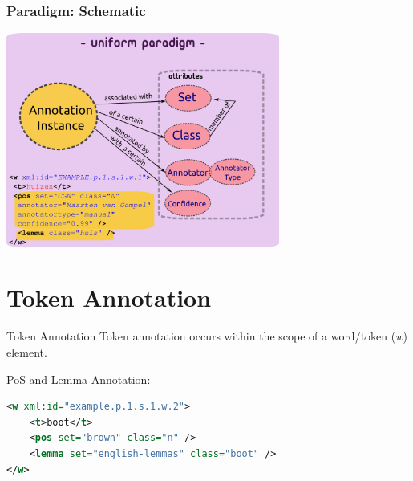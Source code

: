 \documentclass[compress]{beamer}
\begin{document}
\begin{frame}
        \frametitle{Paradigm: Schematic}
        \begin{center}
        \includegraphics[width=90.0mm]{paradigm.png}
        \end{center}
\end{frame}


\section{Token Annotation}

\begin{frame}[fragile]
    \begin{block}{Token Annotation}
        Token annotation occurs within the scope of a word/token (\emph{w}) element.
    \end{block}
    \begin{example}
       PoS and Lemma Annotation:
\begin{lstlisting}[language=xml]
<w xml:id="example.p.1.s.1.w.2">
    <t>boot</t>
    <pos set="brown" class="n" />
    <lemma set="english-lemmas" class="boot" />
</w>                         
\end{lstlisting}        
    \end{example}
\end{frame}
\end{document}

